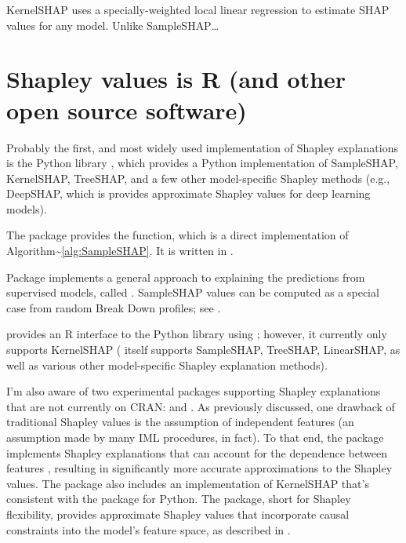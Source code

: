 KernelSHAP \citep{lundberg-2017-KernelSHAP} uses a specially-weighted
local linear regression to estimate SHAP values for any model. Unlike
SampleSHAP\ldots{}

\section{Shapley values is R (and other open source software)}

Probably the first, and most widely used implementation of Shapley
explanations is the Python  library
\citep{lundberg-2017-KernelSHAP}, which provides a Python implementation
of SampleSHAP, KernelSHAP, TreeSHAP, and a few other model-specific
Shapley methods (e.g., DeepSHAP, which is provides approximate Shapley
values for deep learning models).

The  package \citep{R-iml} provides the 
function, which is a direct implementation of
Algorithm\textasciitilde{}\ref{alg:SampleSHAP}. It is written in
 \citep{R-R6}.

Package  implements a general approach to explaining
the predictions from supervised models, called 
\citep{gosiewska-2019-iBreakDown}. SampleSHAP values can be computed as
a special case from random Break Down profiles; see
.

 provides an R interface to the Python 
library using  \citep{R-reticulate}; however, it
currently only supports KernelSHAP ( itself supports
SampleSHAP, TreeSHAP, LinearSHAP, as well as various other
model-specific Shapley explanation methods).

I'm also aware of two experimental packages supporting Shapley
explanations that are not currently on CRAN: 
\citep{R-sellereite} and  \citep{R-shapFlex}. As
previously discussed, one drawback of traditional Shapley values is the
assumption of independent features (an assumption made by many IML
procedures, in fact). To that end, the  package implements
Shapley explanations that can account for the dependence between
features \citep{aas-2019-explaining}, resulting in significantly more
accurate approximations to the Shapley values. The package also includes
an implementation of KernelSHAP that's consistent with the 
package for Python. The  package, short for Shapley
flexibility, provides approximate Shapley values that incorporate causal
constraints into the model's feature space, as described in
\citet{frye-2019-asymmetric}.

